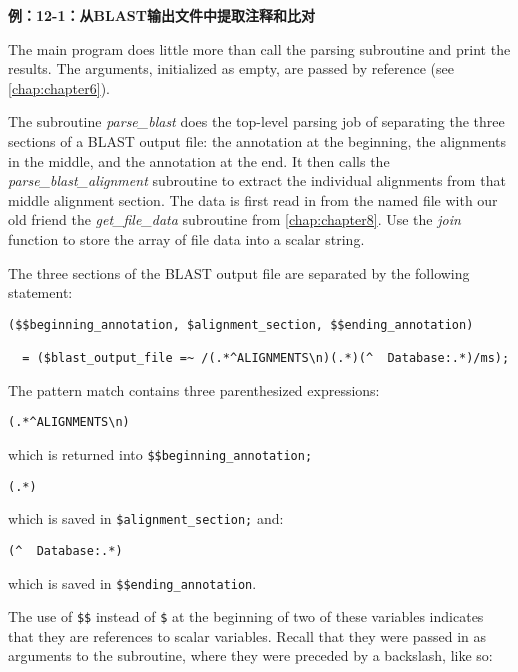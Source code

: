 \textbf{例：12-1：从BLAST输出文件中提取注释和比对}


The main program does little more than call the parsing subroutine and print the results. The arguments, initialized as empty, are passed by reference (see \autoref{chap:chapter6}).  

The subroutine \textit{parse\_blast} does the top-level parsing job of separating the three sections of a BLAST output file: the annotation at the beginning, the alignments in the middle, and the annotation at the end.  It then calls the \textit{parse\_blast\_alignment} subroutine to extract the individual alignments from that middle alignment section. The data is first read in from the named file with our old friend the \textit{get\_file\_data} subroutine from \autoref{chap:chapter8}. Use the \textit{join} function to store the array of file data into a scalar string.

The three sections of the BLAST output file are separated by the following statement: 

\begin{lstlisting}
($$beginning_annotation, $alignment_section, $$ending_annotation)

  = ($blast_output_file =~ /(.*^ALIGNMENTS\n)(.*)(^  Database:.*)/ms);
\end{lstlisting}

The pattern match contains three parenthesized expressions: 

\begin{lstlisting}
(.*^ALIGNMENTS\n) 
\end{lstlisting}

which is returned into \verb|$$beginning_annotation;|

\begin{lstlisting}
(.*) 
\end{lstlisting}

which is saved in \verb|$alignment_section;| and:

\begin{lstlisting}
(^  Database:.*) 
\end{lstlisting}

which is saved in \verb|$$ending_annotation|.

The use of \verb|$$| instead of \verb|$| at the beginning of two of these variables indicates that they are references to scalar variables. Recall that they were passed in as arguments to the subroutine, where they were preceded by a backslash, like so: 

